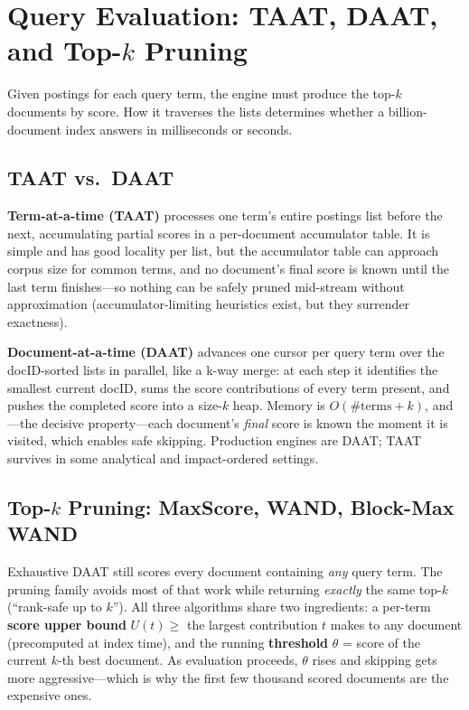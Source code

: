 \section{Query Evaluation: TAAT, DAAT, and Top-$k$ Pruning}
\label{sr:sec:query_eval}

Given postings for each query term, the engine must produce the top-$k$ documents by score. How it traverses the lists determines whether a billion-document index answers in milliseconds or seconds.

\subsection{TAAT vs.\ DAAT}

\textbf{Term-at-a-time (TAAT)} processes one term's entire postings list before the next, accumulating partial scores in a per-document accumulator table. It is simple and has good locality per list, but the accumulator table can approach corpus size for common terms, and no document's final score is known until the last term finishes---so nothing can be safely pruned mid-stream without approximation (accumulator-limiting heuristics exist, but they surrender exactness).

\textbf{Document-at-a-time (DAAT)} advances one cursor per query term over the docID-sorted lists in parallel, like a k-way merge: at each step it identifies the smallest current docID, sums the score contributions of every term present, and pushes the completed score into a size-$k$ heap. Memory is $O(\text{\#terms} + k)$, and---the decisive property---each document's \emph{final} score is known the moment it is visited, which enables safe skipping. Production engines are DAAT; TAAT survives in some analytical and impact-ordered settings.

\subsection{Top-$k$ Pruning: MaxScore, WAND, Block-Max WAND}

Exhaustive DAAT still scores every document containing \emph{any} query term. The pruning family avoids most of that work while returning \emph{exactly} the same top-$k$ (``rank-safe up to $k$''). All three algorithms share two ingredients: a per-term \textbf{score upper bound} $U(t) \ge$ the largest contribution $t$ makes to any document (precomputed at index time), and the running \textbf{threshold} $\theta$ = score of the current $k$-th best document. As evaluation proceeds, $\theta$ rises and skipping gets more aggressive---which is why the first few thousand scored documents are the expensive ones.

